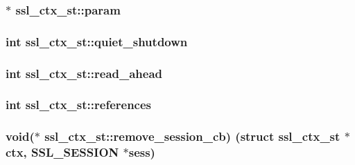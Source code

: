 \subsubsection[{\texorpdfstring{param}{param}}]{$\ast$ ssl\+\_\+ctx\+\_\+st\+::param}\hypertarget{structssl__ctx__st_a27c15c2ea4e216baacb44a5bf166cfa1}{}\label{structssl__ctx__st_a27c15c2ea4e216baacb44a5bf166cfa1}
\subsubsection[{\texorpdfstring{quiet\+\_\+shutdown}{quiet_shutdown}}]{\setlength{\rightskip}{0pt plus 5cm}int ssl\+\_\+ctx\+\_\+st\+::quiet\+\_\+shutdown}\hypertarget{structssl__ctx__st_a325f28f265dae1b20da7c813e41bdb96}{}\label{structssl__ctx__st_a325f28f265dae1b20da7c813e41bdb96}
\subsubsection[{\texorpdfstring{read\+\_\+ahead}{read_ahead}}]{\setlength{\rightskip}{0pt plus 5cm}int ssl\+\_\+ctx\+\_\+st\+::read\+\_\+ahead}\hypertarget{structssl__ctx__st_a454cbb1294b6b36ab36cff39c541ba70}{}\label{structssl__ctx__st_a454cbb1294b6b36ab36cff39c541ba70}
\subsubsection[{\texorpdfstring{references}{references}}]{\setlength{\rightskip}{0pt plus 5cm}int ssl\+\_\+ctx\+\_\+st\+::references}\hypertarget{structssl__ctx__st_aaefa58bdf5771d0ae34e05dbc372f6c3}{}\label{structssl__ctx__st_aaefa58bdf5771d0ae34e05dbc372f6c3}
\subsubsection[{\texorpdfstring{remove\+\_\+session\+\_\+cb}{remove_session_cb}}]{\setlength{\rightskip}{0pt plus 5cm}void($\ast$ ssl\+\_\+ctx\+\_\+st\+::remove\+\_\+session\+\_\+cb) (struct {\bf ssl\+\_\+ctx\+\_\+st} $\ast$ctx, {\bf S\+S\+L\+\_\+\+S\+E\+S\+S\+I\+ON} $\ast$sess)}\hypertarget{structssl__ctx__st_a52d5ac51adc42ec8253a089cbc25afcc}{}\label{structssl__ctx__st_a52d5ac51adc42ec8253a089cbc25afcc}
